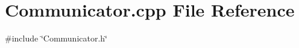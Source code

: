 \section{Communicator.\+cpp File Reference}
\label{_communicator_8cpp}
{\ttfamily \#include \char`\"{}Communicator.\+h\char`\"{}}\newline
